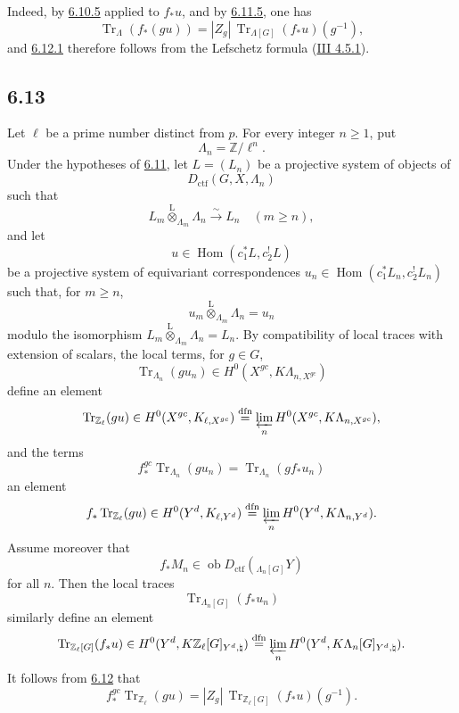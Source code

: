 \documentclass[11pt]{article}
\DeclareMathOperator{\Hom}{Hom}
\providecommand{\Tr}{\operatorname{Tr}}
\providecommand{\Tr}{\operatorname{Tr}}
\providecommand{\lten}{\overset{\mathrm L}{\otimes}}
\providecommand{\Ob}{\operatorname{ob}}
\providecommand{\Tr}{\operatorname{Tr}}
\providecommand{\Hom}{\operatorname{Hom}}
\providecommand{\lten}{\overset{\mathrm L}{\otimes}}
\providecommand{\lten}{\overset{\mathrm L}{\otimes}}
\providecommand{\Ob}{\operatorname{ob}}
\providecommand{\Tr}{\operatorname{Tr}}
\providecommand{\lten}{\overset{\mathrm L}{\otimes}}
\providecommand{\lten}{\overset{\mathrm L}{\otimes}}
\providecommand{\Ob}{\operatorname{Ob}}
\providecommand{\lten}{\overset{\mathrm L}{\otimes}}
\providecommand{\Hom}{\operatorname{Hom}}
\providecommand{\Tr}{\operatorname{Tr}}
\providecommand{\Ob}{\operatorname{ob}}
\providecommand{\Ob}{\operatorname{Ob}}
\providecommand{\lten}{\overset{\mathrm L}{\otimes}}
\begin{document}
Indeed, by \hyperref[sga5:IIIB:equation:6.10.5]{6.10.5} applied to $f_*u$, and by \hyperref[sga5:IIIB:equation:6.11.5]{6.11.5}, one has
\[
\Tr_{\Lambda}(f_*(gu))=|Z_g|\,\Tr_{\Lambda[G]}(f_*u)(g^{-1}),
\]
and \hyperref[sga5:IIIB:equation:6.12.1]{6.12.1} therefore follows from the Lefschetz formula (\hyperref[sga5:III:equation:4.5.1]{III 4.5.1}).

\subsection*{6.13}\label{sga5:IIIB:subsection:6.13}
Let $\ell$ be a prime number distinct from $p$. For every integer $n\ge1$, put
\[
\Lambda_n=\mathbb Z/\ell^n.
\]
Under the hypotheses of \hyperref[sga5:IIIB:subsection:6.11]{6.11}, let $L=(L_n)$ be a projective system of objects of
\[
D_{\mathrm{ctf}}(G,X,\Lambda_n)
\]
such that
\[
L_m\lten_{\Lambda_m}\Lambda_n\xrightarrow{\sim}L_n\quad (m\ge n),
\]
and let
\[
u\in\Hom(c_1^*L,c_2^!L)
\]
be a projective system of equivariant correspondences $u_n\in\Hom(c_1^*L_n,c_2^!L_n)$ such that, for $m\ge n$,
\[
u_m\lten_{\Lambda_m}\Lambda_n=u_n
\]
modulo the isomorphism $L_m\lten_{\Lambda_m}\Lambda_n=L_n$. By compatibility of local traces with extension of scalars, the local terms, for $g\in G$,
\[
\Tr_{\Lambda_n}(gu_n)\in H^0(X^{gc},K\Lambda_{n,X^{gc}})
\]
define an element
\[
\Tr_{\mathbb Z_{\ell}}(gu)\in
H^0(X^{gc},K_{\ell,X^{gc}})
\stackrel{\mathrm{dfn}}{=}
\varprojlim_n H^0(X^{gc},K\Lambda_{n,X^{gc}}),
\]
and the terms
\[
f_*^{gc}\Tr_{\Lambda_n}(gu_n)=\Tr_{\Lambda_n}(gf_*u_n)
\]
an element
\[
f_*\Tr_{\mathbb Z_{\ell}}(gu)\in
H^0(Y^d,K_{\ell,Y^d})
\stackrel{\mathrm{dfn}}{=}
\varprojlim_n H^0(Y^d,K\Lambda_{n,Y^d}).
\]
Assume moreover that
\[
f_*M_n\in\Ob D_{\mathrm{ctf}}({}_{\Lambda_n[G]}Y)
\]
for all $n$. Then the local traces
\[
\Tr_{\Lambda_n[G]}(f_*u_n)
\]
similarly define an element
\[
\Tr_{\mathbb Z_{\ell}[G]}(f_*u)\in
H^0(Y^d,K\mathbb Z_{\ell}[G]_{Y^d,\natural})
\stackrel{\mathrm{dfn}}{=}
\varprojlim_n H^0(Y^d,K\Lambda_n[G]_{Y^d,\natural}).
\]
It follows from \hyperref[sga5:IIIB:proposition:6.12]{6.12} that
\begin{equation}
f_*^{gc}\Tr_{\mathbb Z_{\ell}}(gu)
=
|Z_g|\,\Tr_{\mathbb Z_{\ell}[G]}(f_*u)(g^{-1}).
\tag{6.13.1}\label{sga5:IIIB:equation:6.13.1}
\end{equation}
\end{document}
